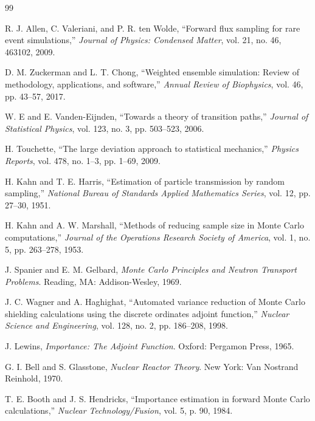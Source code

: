 \documentclass[a4paper,fleqn]{cas-sc}
\begin{document}
	\begin{thebibliography}{99}
		
		R. J. Allen, C. Valeriani, and P. R. ten Wolde, ``Forward flux sampling for rare event simulations,'' \emph{Journal of Physics: Condensed Matter}, vol. 21, no. 46, 463102, 2009.
		
		D. M. Zuckerman and L. T. Chong, ``Weighted ensemble simulation: Review of methodology, applications, and software,'' \emph{Annual Review of Biophysics}, vol. 46, pp. 43--57, 2017.
		
		W. E and E. Vanden-Eijnden, ``Towards a theory of transition paths,'' \emph{Journal of Statistical Physics}, vol. 123, no. 3, pp. 503--523, 2006.
		
		H. Touchette, ``The large deviation approach to statistical mechanics,'' \emph{Physics Reports}, vol. 478, no. 1--3, pp. 1--69, 2009.
		
		H. Kahn and T. E. Harris, ``Estimation of particle transmission by random sampling,'' \emph{National Bureau of Standards Applied Mathematics Series}, vol. 12, pp. 27--30, 1951.
		
		H. Kahn and A. W. Marshall, ``Methods of reducing sample size in Monte Carlo computations,'' \emph{Journal of the Operations Research Society of America}, vol. 1, no. 5, pp. 263--278, 1953.
		
		J. Spanier and E. M. Gelbard, \emph{Monte Carlo Principles and Neutron Transport Problems}. Reading, MA: Addison-Wesley, 1969.
		
		J. C. Wagner and A. Haghighat, ``Automated variance reduction of Monte Carlo shielding calculations using the discrete ordinates adjoint function,'' \emph{Nuclear Science and Engineering}, vol. 128, no. 2, pp. 186--208, 1998.
		
		J. Lewins, \emph{Importance: The Adjoint Function}. Oxford: Pergamon Press, 1965.
		
		G. I. Bell and S. Glasstone, \emph{Nuclear Reactor Theory}. New York: Van Nostrand Reinhold, 1970.
		
		T. E. Booth and J. S. Hendricks, ``Importance estimation in forward Monte Carlo calculations,'' \emph{Nuclear Technology/Fusion}, vol. 5, p. 90, 1984.
		

\end{thebibliography}
\end{document}
